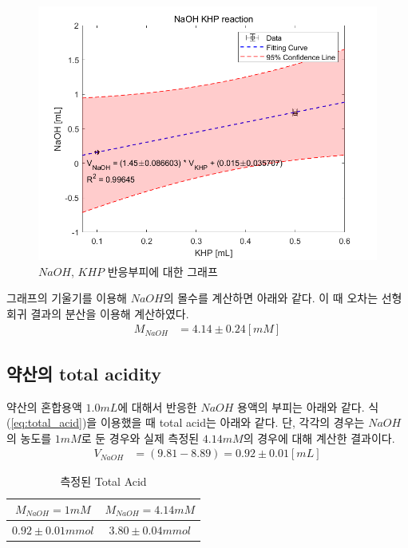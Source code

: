 \documentclass[%
 reprint,
 amsmath,amssymb,
 aps,
]{revtex4-2}
\begin{document}
\begin{figure}[htbp]
	\includegraphics[width = 0.95\linewidth]{NaOH_KHP.png}%
	\caption{\label{fig:NaOH_KHP}$NaOH$, $KHP$ 반응부피에 대한 그래프}
\end{figure}
그래프의 기울기를 이용해 $NaOH$의 몰수를 계산하면 아래와 같다. 이 때 오차는 선형회귀 결과의 분산을 이용해 계산하였다.
\begin{align}
	M_{NaOH} &= 4.14 \pm 0.24 [mM]
\end{align}


\subsection{\label{sec:level2}약산의 total acidity}
약산의 혼합용액 $1.0mL$에 대해서 반응한 $NaOH$ 용액의 부피는 아래와 같다. 식 (\ref{eq:total_acid})을 이용했을 때 total acid는 아래와 같다. 단, 각각의 경우는 $NaOH$의 농도를 $1mM$로 둔 경우와 실제 측정된 $4.14mM$의 경우에 대해 계산한 결과이다.
\begin{align}
	V_{NaOH} &= (9.81 - 8.89) = 0.92 \pm 0.01 [mL]
\end{align}

\begin{table}[]
\begin{tabular}{c|c} \hline \hline
$M_{NaOH} = 1mM$ & $M_{NaOH} = 4.14mM$ \\ \hline
$0.92\pm0.01mmol$ & $3.80\pm0.04mmol$  \\ \hline
\end{tabular}
\caption{\label{tab:total acid}측정된 Total Acid}
\end{table}
\end{document}
